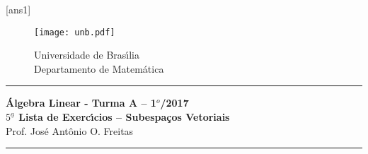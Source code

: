 \documentclass[12pt]{exam}
\newtheorem{exercicio}{}
\newcommand{\cp}[1]{\mathbb{#1}}
\newcommand{\vesp}[1]{\vspace{ #1  cm}}
\begin{document}
\pagestyle{empty}

[ans1]

\begin{figure}[h]
        \begin{minipage}[c]{1.7cm}
        \texttt{[image: unb.pdf]}
        \end{minipage}%
        \hspace{0pt}
        \begin{minipage}[c]{4in}
          {Universidade de Bras{\'\i}lia} \\
          {Departamento de Matem{\'a}tica}
\end{minipage}
\end{figure}

\vesp{-0.35} \hrule

\begin{center}
{\Large\bf \'Algebra Linear - Turma A -- 1$^{o}$/2017} \\ \vspace{9pt} {\large\bf
  $5^{\underline{a}}$ Lista de Exerc{\'\i}cios -- Subespa\c{c}os Vetoriais}\\ \vspace{9pt} Prof. Jos{\'e} Ant{\^o}nio O. Freitas
\end{center}
\hrule

\vesp{.6}


\end{document}
